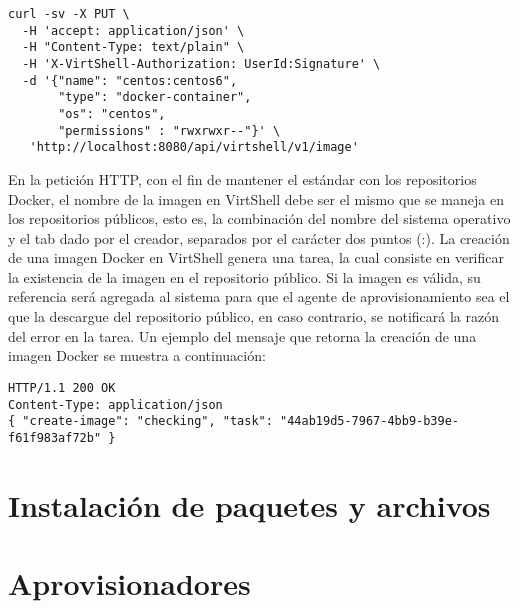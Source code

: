 \vspace{5mm}

\begin{lstlisting}[style=json, caption=Petición HTTP para crear una imagen para contenedores Docker]
curl -sv -X PUT \
  -H 'accept: application/json' \
  -H "Content-Type: text/plain" \
  -H 'X-VirtShell-Authorization: UserId:Signature' \
  -d '{"name": "centos:centos6",
       "type": "docker-container",
       "os": "centos",
       "permissions" : "rwxrwxr--"}' \
   'http://localhost:8080/api/virtshell/v1/image'
\end{lstlisting}

\vspace{5mm}

En la petición HTTP, con el fin de mantener el estándar con los repositorios Docker, el nombre de la imagen en VirtShell debe ser el mismo que se maneja en los repositorios públicos, esto es, la combinación del nombre del sistema operativo y el tab dado por el creador, separados por el carácter dos puntos (:). La creación de una imagen Docker en VirtShell genera una tarea, la cual consiste en verificar la existencia de la imagen en el repositorio público. Si la imagen es válida, su referencia será agregada al sistema para que el agente de aprovisionamiento sea el que la descargue del repositorio público, en caso contrario, se notificará la razón del error en la tarea. Un ejemplo del mensaje que retorna la creación de una imagen Docker se muestra a continuación:

\vspace{5mm}

\begin{lstlisting}[style=json, caption=Ejemplo de respuesta HTTP para la creación de una imagen]
HTTP/1.1 200 OK
Content-Type: application/json
{ "create-image": "checking", "task": "44ab19d5-7967-4bb9-b39e-f61f983af72b" }
\end{lstlisting}


\section{Instalación de paquetes y archivos}

\section{Aprovisionadores}





